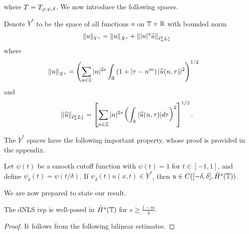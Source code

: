 %
%
where $T = T_{\varphi, \psi, \delta}$. We now introduce the following spaces. 
%
\begin{definition}
	Denote $\dot{Y}^s$ to be the space of all
	functions $u$ on $\mathbb{T} \times \mathbb{R}$ with
	bounded norm
\begin{equation}
	\label{1Y-s-norm}
	\begin{split}
		\|u\|_{\dot{Y}^s} = \|u\|_{\dot{X}^s} + \||n|^s \widehat{ u}\|_{ \dot{\ell}^2_n L^1_\tau }
	\end{split}
\end{equation}
%
%
%
%
where
%
\begin{equation}
	\label{1X^s-norm}
	\begin{split}
		& \|u\|_{\dot{X}^s}
		= \left ( \sum_{n\in \mathbb{Z}} |n|^{2s} \int_{\mathbb{R}} \left ( 1 + | 
		\tau - n^m \right ) | \widehat{u} ( n, \tau ) |^2
		\right )^{1/2}
	\end{split}
\end{equation}
and
%
%
\begin{equation}
	\label{1E-norm}
	\| \widehat{u}\|_{ \dot{\ell}^2_n L^1_\tau } = \left[ \sum_{n \in \dot{\mathbb{Z}}}| n |^{2s} \left(
	\int_{\mathbb{R}}| \widehat{u}(n, \tau) |d \tau \right)^{2} \right]^{1/2}.
\end{equation}
%
%
%
%
\end{definition}
The $\dot{Y}^s$ spaces have the following important property, whose proof
is provided in the appendix.
\begin{lemma}
	\label{1lem:cutoff-loc-soln}
  Let $\psi(t)$ be a smooth cutoff function with $\psi(t) =1$ for $t \in [-1,
  1]$, and define $\psi_{\delta}(t) = \psi(t/\delta)$. If
  $\psi_{\delta}(t)u(x,t) \in \dot{Y}^s$, then $u \in C([-\delta, \delta],
  \dot{H}^s(\mathbb{T}))$.
\end{lemma}
%
We are now prepared to state our result.
%
%
%
%
%
%
%
\begin{theorem}
	\label{1thm:prim}
	The dNLS ivp is well-posed in $\dot{H}^s(\mathbb{T})$ for $s \ge \frac{1-m}{4}$.  
\end{theorem}
%
%
%
%
%
%
%
%
%
%
%
%
%
%
\begin{proof}
  It follows from the following bilinear estimates.
\end{proof}
%
%
%
%
%
%
%

